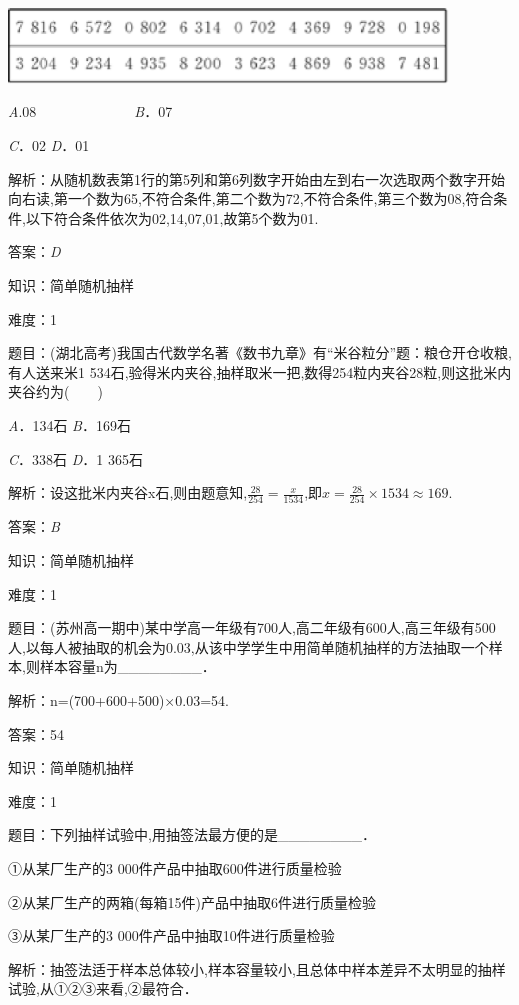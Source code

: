 \documentclass{article} %
\begin{document}
\textit{\includegraphics*[width=4.60in, height=0.79in, keepaspectratio=false]{image79}}

\textit{A}.08　　　　　　　\textit{B}．07

\textit{C}．02             \textit{D}．01

解析：从随机数表第1行的第5列和第6列数字开始由左到右一次选取两个数字开始向右读,第一个数为65,不符合条件,第二个数为72,不符合条件,第三个数为08,符合条件,以下符合条件依次为02,14,07,01,故第5个数为01.

答案：\textit{D}

知识：简单随机抽样

难度：1

题目：(湖北高考)我国古代数学名著《数书九章》有``米谷粒分''题：粮仓开仓收粮,有人送来米1 534石,验得米内夹谷,抽样取米一把,数得254粒内夹谷28粒,则这批米内夹谷约为(　　)

\textit{A}．134石  \textit{B}．169石

\textit{C}．338石  \textit{D}．1 365石

解析：设这批米内夹谷x石,则由题意知,$\frac{28}{254}=\frac{x}{1534}$,即$x=\frac{28}{254}\times1534\approx169$.

答案：\textit{B}

知识：简单随机抽样

难度：1

题目：(苏州高一期中)某中学高一年级有700人,高二年级有600人,高三年级有500人,以每人被抽取的机会为0.03,从该中学学生中用简单随机抽样的方法抽取一个样本,则样本容量n为\_\_\_\_\_\_\_\_．

解析：n=(700+600+500)$\mathrm{\times}$0.03=54.

答案：54

知识：简单随机抽样

难度：1

题目：下列抽样试验中,用抽签法最方便的是\_\_\_\_\_\_\_\_．

①从某厂生产的3 000件产品中抽取600件进行质量检验

②从某厂生产的两箱(每箱15件)产品中抽取6件进行质量检验

③从某厂生产的3 000件产品中抽取10件进行质量检验

解析：抽签法适于样本总体较小,样本容量较小,且总体中样本差异不太明显的抽样试验,从①②③来看,②最符合．
\end{document}

